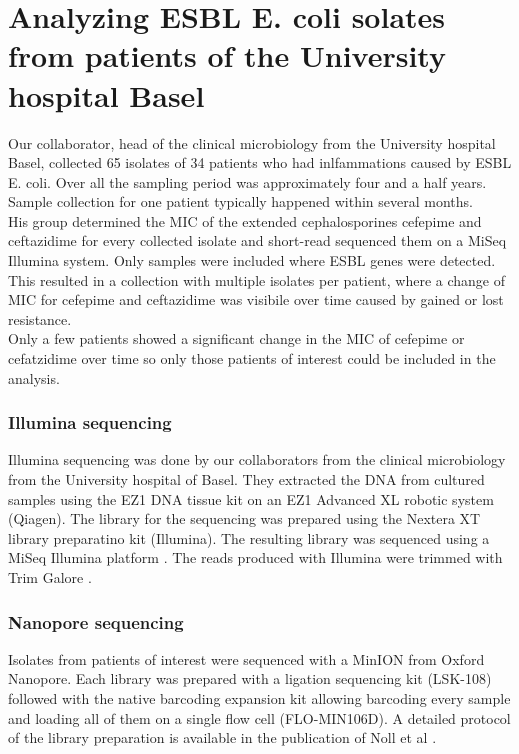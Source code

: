 \section{Analyzing ESBL E. coli solates from patients of the University hospital Basel}
Our collaborator, head of the clinical microbiology from the University hospital Basel, collected 65 isolates of 34 patients who had inlfammations caused by ESBL E. coli. Over all the sampling period was approximately four and a half years. Sample collection for one patient typically happened within several months. \\
His group determined the MIC of the extended cephalosporines cefepime and ceftazidime for every collected isolate  and short-read sequenced them on a MiSeq Illumina system. Only samples were included where ESBL genes were detected. This resulted in a collection with multiple isolates per patient, where a change of MIC for cefepime and ceftazidime was visibile over time caused by gained or lost resistance.\\
Only a few patients showed a significant change in the MIC of cefepime or cefatzidime over time so only those patients of interest could be included in the analysis.  

\subsubsection{Illumina sequencing}
Illumina sequencing was done by our collaborators from the clinical microbiology from the University hospital of Basel. They extracted the DNA from cultured samples using the EZ1 DNA tissue kit on an EZ1 Advanced XL robotic system (Qiagen). The library for the sequencing was prepared using the Nextera XT library preparatino kit (Illumina). The resulting library was sequenced using a MiSeq Illumina platform \cite{nanopore}. The reads produced with Illumina were trimmed with Trim Galore \cite{noauthor_babraham_nodate}.

\subsubsection{Nanopore sequencing}
Isolates from patients of interest were sequenced with a MinION from Oxford Nanopore. Each library was prepared with a ligation sequencing kit (LSK-108) followed with the native barcoding expansion kit allowing barcoding every sample and loading all of them on a single flow cell (FLO-MIN106D). A detailed protocol of the library preparation is available in the publication of Noll et al \cite{noauthor_resolving_nodate}.

